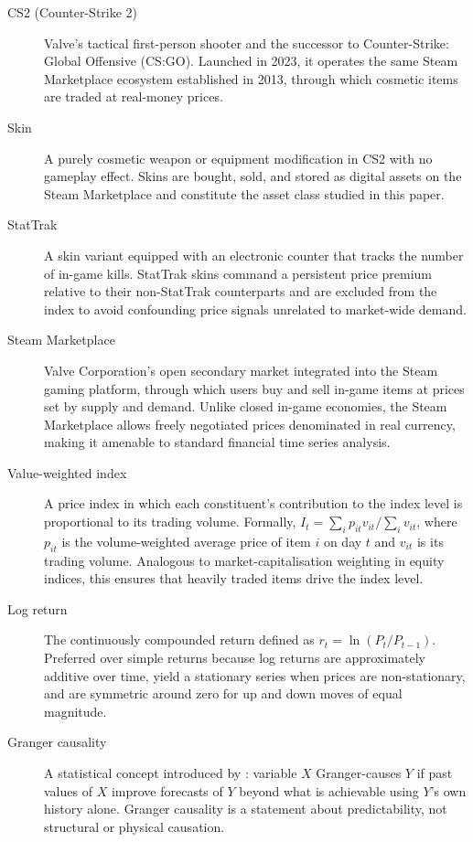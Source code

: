 \begin{description}
  \item[CS2 (Counter-Strike 2)]
    Valve's tactical first-person shooter and the successor to Counter-Strike:
    Global Offensive (CS:GO). Launched in 2023, it operates the same Steam
    Marketplace ecosystem established in 2013, through which cosmetic items are
    traded at real-money prices.

  \item[Skin]
    A purely cosmetic weapon or equipment modification in CS2 with no gameplay
    effect. Skins are bought, sold, and stored as digital assets on the Steam
    Marketplace and constitute the asset class studied in this paper.

  \item[StatTrak]
    A skin variant equipped with an electronic counter that tracks the number
    of in-game kills. StatTrak skins command a persistent price premium
    relative to their non-StatTrak counterparts and are excluded from the index
    to avoid confounding price signals unrelated to market-wide demand.

  \item[Steam Marketplace]
    Valve Corporation's open secondary market integrated into the Steam gaming
    platform, through which users buy and sell in-game items at prices set by
    supply and demand. Unlike closed in-game economies, the Steam Marketplace
    allows freely negotiated prices denominated in real currency, making it
    amenable to standard financial time series analysis.

  \item[Value-weighted index]
    A price index in which each constituent's contribution to the index level
    is proportional to its trading volume. Formally, $I_t =
    \sum_i p_{it} v_{it} / \sum_i v_{it}$, where $p_{it}$ is the
    volume-weighted average price of item $i$ on day $t$ and $v_{it}$ is its
    trading volume. Analogous to market-capitalisation weighting in equity
    indices, this ensures that heavily traded items drive the index level.

  \item[Log return]
    The continuously compounded return defined as $r_t = \ln(P_t / P_{t-1})$.
    Preferred over simple returns because log returns are approximately
    additive over time, yield a stationary series when prices are
    non-stationary, and are symmetric around zero for up and down moves of
    equal magnitude.

  \item[Granger causality]
    A statistical concept introduced by \citeauthor{granger1969causal}
    \cite{granger1969causal}: variable $X$ Granger-causes $Y$ if past values of
    $X$ improve forecasts of $Y$ beyond what is achievable using $Y$'s own
    history alone. Granger causality is a statement about predictability, not
    structural or physical causation.


\end{description}
